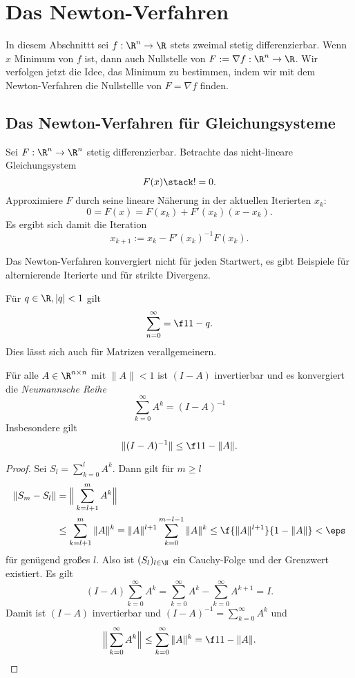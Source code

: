 \section{Das Newton-Verfahren}


In diesem Abschnittt sei $f: \R^n \to \R$ stets zweimal stetig differenzierbar.
Wenn $\hat x$ Minimum von $f$ ist, dann auch Nullstelle von $F := \nabla f : \R^n \to \R$.
Wir verfolgen jetzt die Idee, das Minimum zu bestimmen, indem wir mit dem Newton-Verfahren die Nullstellle von $F = \nabla f$ finden.

\subsection{Das Newton-Verfahren für Gleichungsysteme}

Sei $F: \R^n \to \R^n$ stetig differenzierbar.
Betrachte das nicht-lineare Gleichungsystem
\[
	F(x) \stack != 0.
\]
Approximiere $F$ durch seine lineare Näherung in der aktuellen Iterierten $x_k$:
\[
	0
	= F(x)
	= F(x_k) + F'(x_k)(x-x_k).
\]
Es ergibt sich damit die Iteration
\[
	x_{k+1}
	:= x_k - F'(x_k)^{-1} F(x_k).
\]

\begin{alg} \label{alg:5}
	\begin{algorithmic}
		\EndWhile
	\end{algorithmic}
\end{alg}

Das Newton-Verfahren konvergiert nicht für jeden Startwert, es gibt Beispiele für alternierende Iterierte und für strikte Divergenz.

Für $q \in \R, |q| < 1$ gilt
\[
	\sum_{n=0}^\infty = \f 1{1-q}.
\]
Dies lässt sich auch für Matrizen verallgemeinern.

\begin{lem} \label{2.40}
	Für alle $A \in \R^{n\times n}$ mit $\|A\| < 1$ ist $(I-A)$ invertierbar und es konvergiert die \emph{Neumannsche Reihe}
	\[
		\sum_{k=0}^\infty A^k
		= (I-A)^{-1}
	\]
	Insbesondere gilt
	\[
		\|(I-A)^{-1}\|
		\le \f 1{1-\|A\|}.
	\]
	\begin{proof}
		Sei $S_l = \sum_{k=0}^l A^k$.
		Dann gilt für $m \ge l$
		\begin{align*}
			\|S_m - S_l\|
			&= \Big\| \sum_{k=l+1}^m A^k \Big\| \\
			&\le \sum_{k=l+1}^m \|A\|^k
			= \|A\|^{l+1} \sum_{k=0}^{m-l-1} \|A\|^k
			\le \f{\|A\|^{l+1}}{1-\|A\|}
			< \eps
		\end{align*}
		für genügend großes $l$.
		Also ist $(S_l)_{l\in\N}$ ein Cauchy-Folge und der Grenzwert existiert.
		Es gilt
		\[
			(I-A) \sum_{k=0}^\infty A^k
			= \sum_{k=0}^\infty A^k - \sum_{k=0}^\infty A^{k+1}
			= I.
		\]
		Damit ist $(I-A)$ invertierbar und $(I-A)^{-1} = \sum_{k=0}^\infty A^k$ und
		\[
			\Big\| \sum_{k=0}^\infty A^k \Big\|
			\le \sum_{k=0}^\infty \|A\|^k
			= \f 1{1-\|A\|}.
		\]
	\end{proof}
\end{lem}

